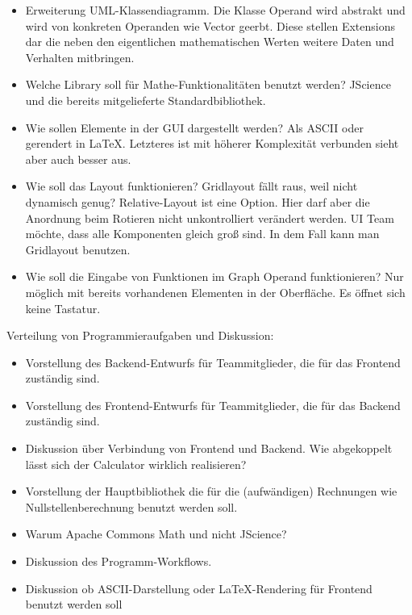 \begin{itemize}
	\item Erweiterung UML-Klassendiagramm. Die Klasse Operand wird abstrakt und wird von konkreten Operanden wie Vector geerbt. Diese stellen Extensions dar die neben den eigentlichen mathematischen Werten weitere Daten und Verhalten mitbringen.
	\item Welche Library soll für Mathe-Funktionalitäten benutzt werden? JScience und die bereits mitgelieferte Standardbibliothek.
	\item Wie sollen Elemente in der GUI dargestellt werden? Als ASCII oder gerendert in LaTeX. Letzteres ist mit höherer Komplexität verbunden sieht aber auch besser aus. 
	\item Wie soll das Layout funktionieren? Gridlayout fällt raus, weil nicht dynamisch genug? Relative-Layout ist eine Option. Hier darf aber die Anordnung beim Rotieren nicht unkontrolliert verändert werden. UI Team möchte, dass alle Komponenten gleich groß sind. In dem Fall kann man Gridlayout benutzen.
	\item Wie soll die Eingabe von Funktionen im Graph Operand funktionieren? Nur möglich mit bereits vorhandenen Elementen in der Oberfläche. Es öffnet sich keine Tastatur.
\end{itemize}


Verteilung von Programmieraufgaben und Diskussion:

\begin{itemize}
	\item Vorstellung des Backend-Entwurfs für Teammitglieder, die für das Frontend zuständig sind. 
	\item Vorstellung des Frontend-Entwurfs für Teammitglieder, die für das Backend zuständig sind.
	\item Diskussion über Verbindung von Frontend und Backend. Wie abgekoppelt lässt sich der Calculator wirklich realisieren?
	\item Vorstellung der Hauptbibliothek die für die (aufwändigen) Rechnungen wie Nullstellenberechnung benutzt werden soll.
	\item Warum Apache Commons Math und nicht JScience?
	\item Diskussion des Programm-Workflows.
	\item Diskussion ob ASCII-Darstellung oder LaTeX-Rendering für Frontend benutzt werden soll
\end{itemize}


